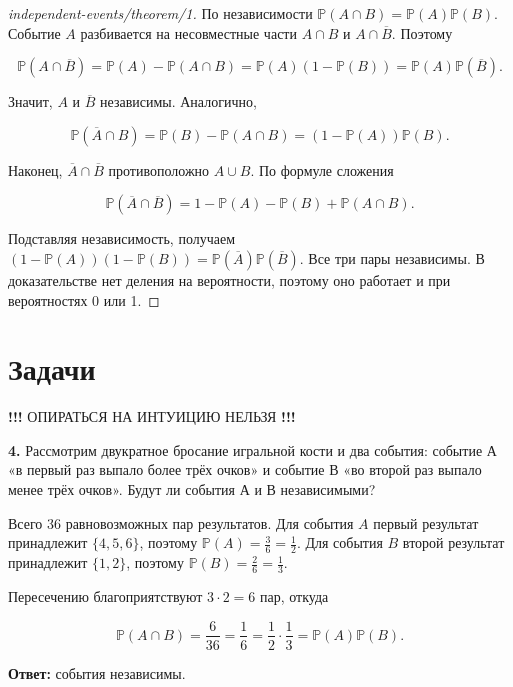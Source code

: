 \begin{proof}[independent-events/theorem/1]\label{solution-independent-events-theorem-1}
По независимости $\mathbb P(A\cap B)=\mathbb P(A)\mathbb P(B)$. Событие $A$ разбивается на несовместные части $A\cap B$ и $A\cap\overline B$. Поэтому

\[\mathbb P(A\cap\overline B)=\mathbb P(A)-\mathbb P(A\cap B)=\mathbb P(A)(1-\mathbb P(B))=\mathbb P(A)\mathbb P(\overline B).\]

Значит, $A$ и $\overline B$ независимы. Аналогично,

\[\mathbb P(\overline A\cap B)=\mathbb P(B)-\mathbb P(A\cap B)=(1-\mathbb P(A))\mathbb P(B).\]

Наконец, $\overline A\cap\overline B$ противоположно $A\cup B$. По формуле сложения

\[\mathbb P(\overline A\cap\overline B)=1-\mathbb P(A)-\mathbb P(B)+\mathbb P(A\cap B).\]

Подставляя независимость, получаем $(1-\mathbb P(A))(1-\mathbb P(B))=\mathbb P(\overline A)\mathbb P(\overline B)$. Все три пары независимы. В доказательстве нет деления на вероятности, поэтому оно работает и при вероятностях 0 или 1.
\end{proof}

\section{Задачи}

\textbf{!!!} ОПИРАТЬСЯ НА ИНТУИЦИЮ НЕЛЬЗЯ \textbf{!!!}\\

\begin{task}\label{task-problems-1}
\textbf{4.} Рассмотрим двукратное бросание игральной кости и два события: событие А «в первый раз выпало более трёх очков» и событие В «во второй раз выпало менее трёх очков». Будут ли события А и В независимыми?
\end{task}

\begin{solution}\label{solution-independent-events-problems-1}
Всего 36 равновозможных пар результатов. Для события $A$ первый результат принадлежит $\{4,5,6\}$, поэтому $\mathbb P(A)=\frac36=\frac12$. Для события $B$ второй результат принадлежит $\{1,2\}$, поэтому $\mathbb P(B)=\frac26=\frac13$.

Пересечению благоприятствуют $3\cdot2=6$ пар, откуда

\[\mathbb P(A\cap B)=\frac6{36}=\frac16=\frac12\cdot\frac13=\mathbb P(A)\mathbb P(B).\]

\textbf{Ответ:} события независимы.
\end{solution}

